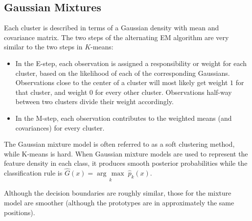 \documentclass[12pt, letterpaper]{article}
\theoremstyle{definition}
\newcommand{\argmax}[1]{\underset{#1}{\operatorname{arg}\,\operatorname{max}}\;}
\begin{document}
\subsection{Gaussian Mixtures}
Each cluster is described in terms of a Gaussian density with mean and covariance matrix. The two steps of the alternating EM algorithm are very similar to the two steps in $K$-means:
\begin{itemize}
\item In the E-step, each observation is assigned a responsibility or weight for each cluster, based on the likelihood of each of the corresponding Gaussians. Observations close to the center of a cluster will most likely get weight $1$ for that cluster, and weight $0$ for every other cluster. Observations half-way between two clusters divide their weight accordingly.
\item In the M-step, each observation contributes to the weighted means (and covariances) for every cluster.
\end{itemize}
The Gaussian mixture model is often referred to as a soft clustering method, while K-means is hard. When Gaussian mixture models are used to represent the feature density in each class, it produces smooth posterior probabilities while the classification rule is $\hat{G}(x) = \argmax{k}{\hat{p}_k(x)}$.

Although the decision boundaries are roughly similar, those for the mixture model are smoother (although the prototypes are in approximately the same positions). 
\end{document}
